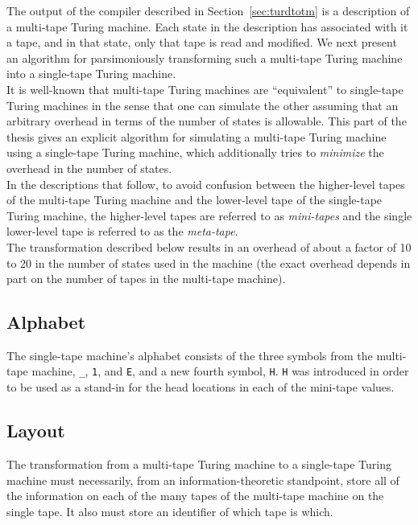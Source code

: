 \documentclass[11pt]{report}
\begin{document}
The output of the compiler described in Section~\ref{sec:turdtotm} is a description of a multi-tape Turing machine. Each state in the description has associated with it a tape, and in that state, only that tape is read and modified. We next present an algorithm for parsimoniously transforming such a multi-tape Turing machine into a single-tape Turing machine. \\

It is well-known that multi-tape Turing machines are ``equivalent'' to single-tape Turing machines in the sense that one can simulate the other assuming that an arbitrary overhead in terms of the number of states is allowable. This part of the thesis gives an explicit algorithm for simulating a multi-tape Turing machine using a single-tape Turing machine, which additionally tries to \emph{minimize} the overhead in the number of states. \\

In the descriptions that follow, to avoid confusion between the higher-level tapes of the multi-tape Turing machine and the lower-level tape of the single-tape Turing machine, the higher-level tapes are referred to as \emph{mini-tapes} and the single lower-level tape is referred to as the \emph{meta-tape}. \\

The transformation described below results in an overhead of about a factor of 10 to 20 in the number of states used in the machine (the exact overhead depends in part on the number of tapes in the multi-tape machine). 

\subsection{Alphabet}

The single-tape machine's alphabet consists of the three symbols from the multi-tape machine, \texttt{\_}, \texttt{1}, and \texttt{E}, and a new fourth symbol, \texttt{H}. \texttt{H} was introduced in order to be used as a stand-in for the head locations in each of the mini-tape values.

\subsection{Layout}

The transformation from a multi-tape Turing machine to a single-tape Turing machine must necessarily, from an information-theoretic standpoint, store all of the information on each of the many tapes of the multi-tape machine on the single tape. It also must store an identifier of which tape is which. \\
\end{document}
